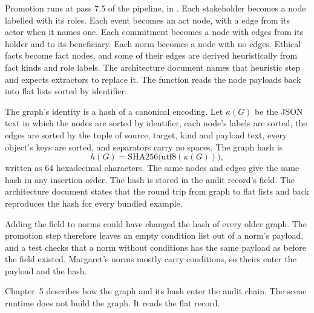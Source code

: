 Promotion runs at pass 7.5 of the pipeline, in . Each stakeholder becomes a
node labelled with its roles. Each event becomes an act node, with a  edge from its
actor when it names one. Each commitment becomes a node with edges from its holder and to its
beneficiary. Each norm becomes a node with no edges. Ethical facts become fact nodes, and some of
their edges are derived heuristically from fact kinds and role labels. The architecture document
names that heuristic step and expects extractors to replace it. The function
 reads the node payloads back into flat lists sorted by identifier.

The graph's identity is a hash of a canonical encoding. Let $\kappa(G)$ be the JSON text in which the
nodes are sorted by identifier, each node's labels are sorted, the edges are sorted by the tuple of
source, target, kind and payload text, every object's keys are sorted, and separators carry no
spaces. The graph hash is
\begin{equation}
h(G) = \mathrm{SHA256}\bigl(\mathrm{utf8}(\kappa(G))\bigr),
\label{eq:graph-hash}
\end{equation}
written as 64 hexadecimal characters. The same nodes and edges give the same hash in any insertion
order. The hash is stored in the audit record's  field. The architecture document
states that the round trip from graph to flat lists and back reproduces the hash for every bundled
example.

Adding the  field to norms could have changed the hash of every older graph. The
promotion step therefore leaves an empty condition list out of a norm's payload, and a test checks
that a norm without conditions has the same payload as before the field existed. Margaret's norms
mostly carry conditions, so theirs enter the payload and the hash.

Chapter~5 describes how the graph and its hash enter the audit chain. The scene runtime does not
build the graph. It reads the flat record.

